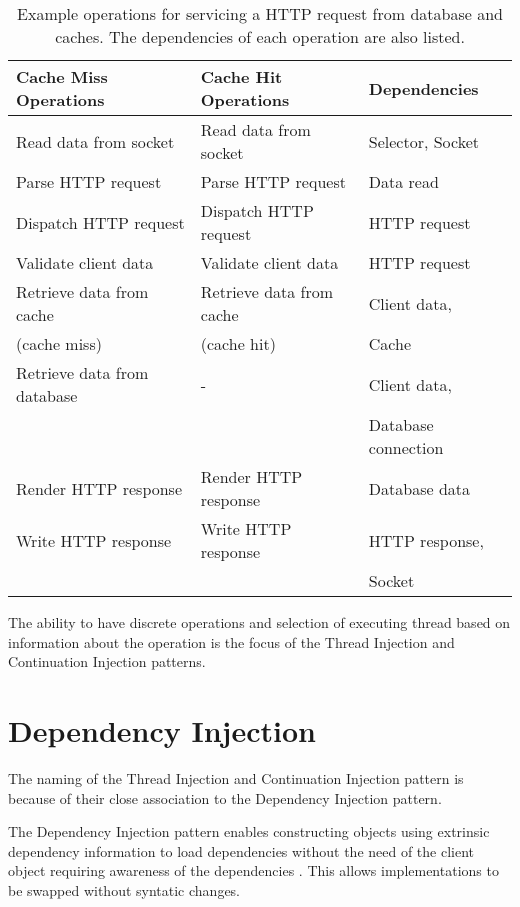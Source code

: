 \documentclass{article}
\begin{document}
\begin{table}[!h]
\renewcommand{\arraystretch}{1.3}
\centering
\begin{tabular}{l||l||l}
\hline
\bfseries Cache Miss Operations & \bfseries Cache Hit Operations & \bfseries Dependencies \\
\hline\hline
Read data from socket & Read data from socket & Selector, Socket \\
\hline
Parse HTTP request & Parse HTTP request & Data read \\
\hline
Dispatch HTTP request & Dispatch HTTP request & HTTP request \\
\hline
Validate client data & Validate client data & HTTP request \\
\hline
Retrieve data from cache & Retrieve data from cache & Client data, \\
(cache miss) & (cache hit) & Cache \\
\hline
Retrieve data from database & - & Client data, \\
 & & Database connection \\
\hline
Render HTTP response & Render HTTP response & Database data \\
\hline
Write HTTP response & Write HTTP response & HTTP response, \\ 
 & & Socket \\
\hline
\end{tabular}
\caption{Example operations for servicing a HTTP request from database and caches. The dependencies of each operation are also listed.}
\label{tab:example_request_operations}
\end{table}

The ability to have discrete operations and selection of executing thread based
on information about the operation is the focus of the Thread Injection and
Continuation Injection patterns.


\section{Dependency Injection}

The naming of the Thread Injection and Continuation Injection pattern is because
of their close association to the Dependency Injection pattern.

The Dependency Injection pattern enables constructing objects using extrinsic
dependency information to load dependencies without the need of the client
object requiring awareness of the dependencies \cite{ioc}.  This allows
implementations to be swapped without syntatic changes.
\end{document}
